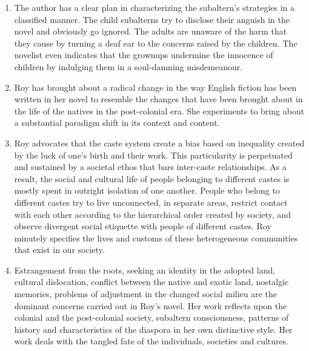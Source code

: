 \begin{enumerate}
  \item The author has a clear plan in characterizing the subaltern's strategies in a classified manner. The child subalterns try to disclose their anguish in the novel and obviously go ignored. The adults are unaware of the harm that they cause by turning a deaf ear to the concerns raised by the children. The novelist even indicates that the grownups undermine the innocence of children by indulging them in a soul-damning misdemeanour.

  \item Roy has brought about a radical change in the way English fiction has been written in her novel to resemble the changes that have been brought about in the life of the natives in the post-colonial era. She experiments to bring about a substantial paradigm shift in its context and content.

  \item Roy advocates that the caste system create a bias based on inequality created by the luck of one's birth and their work. This particularity is perpetuated and sustained by a societal ethos that bars inter-caste relationships. As a result, the social and cultural life of people belonging to different castes is mostly spent in outright isolation of one another.  People who belong to different castes try to live unconnected, in separate areas, restrict contact with each other according to the hierarchical order created by society, and observe divergent social etiquette with people of different castes. Roy minutely specifies the lives and customs of these heterogeneous communities that exist in our society.

  \item Estrangement from the roots, seeking an identity in the adopted land, cultural dislocation,  conflict between the native and exotic land, nostalgic memories, problems of adjustment in the changed social milieu are the dominant concerns carried out in Roy's novel.  Her work reflects upon the colonial and the post-colonial society, subaltern consciousness, patterns of history and characteristics of the diaspora in her own distinctive style. Her work deals with the tangled fate of the individuals, societies and cultures.


\end{enumerate}
